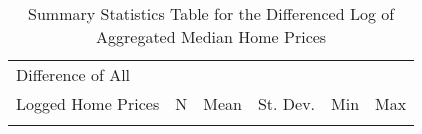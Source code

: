 
\begin{table}[H]
\caption{Summary Statistics Table for the Differenced Log of Aggregated Median Home Prices} \label{tab:ln_HV}
\begin{center}
\begin{tabular}{lccccc} \hline

Difference of  All &  &  &  &  & \\
Logged Home Prices & N & Mean & St. Dev. & Min & Max  \\\hline
\vspace{4pt} & \begin{footnotesize}\end{footnotesize} & \begin{footnotesize}\end{footnotesize} & \begin{footnotesize}\end{footnotesize} & \begin{footnotesize}\end{footnotesize} & \begin{footnotesize}\end{footnotesize} \\


\end{tabular}
\end{center}
\end{table}
